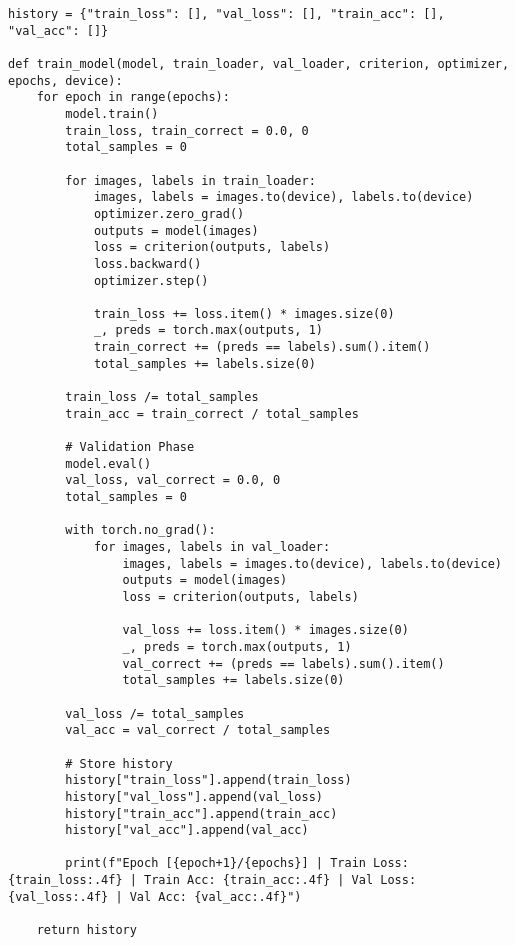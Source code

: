 \documentclass{article}
\begin{document}
\begin{verbatim}
history = {"train_loss": [], "val_loss": [], "train_acc": [], "val_acc": []}

def train_model(model, train_loader, val_loader, criterion, optimizer, epochs, device):
    for epoch in range(epochs):
        model.train()
        train_loss, train_correct = 0.0, 0
        total_samples = 0

        for images, labels in train_loader:
            images, labels = images.to(device), labels.to(device)
            optimizer.zero_grad()
            outputs = model(images)
            loss = criterion(outputs, labels)
            loss.backward()
            optimizer.step()

            train_loss += loss.item() * images.size(0)
            _, preds = torch.max(outputs, 1)
            train_correct += (preds == labels).sum().item()
            total_samples += labels.size(0)

        train_loss /= total_samples
        train_acc = train_correct / total_samples

        # Validation Phase
        model.eval()
        val_loss, val_correct = 0.0, 0
        total_samples = 0

        with torch.no_grad():
            for images, labels in val_loader:
                images, labels = images.to(device), labels.to(device)
                outputs = model(images)
                loss = criterion(outputs, labels)

                val_loss += loss.item() * images.size(0)
                _, preds = torch.max(outputs, 1)
                val_correct += (preds == labels).sum().item()
                total_samples += labels.size(0)

        val_loss /= total_samples
        val_acc = val_correct / total_samples

        # Store history
        history["train_loss"].append(train_loss)
        history["val_loss"].append(val_loss)
        history["train_acc"].append(train_acc)
        history["val_acc"].append(val_acc)

        print(f"Epoch [{epoch+1}/{epochs}] | Train Loss: {train_loss:.4f} | Train Acc: {train_acc:.4f} | Val Loss: {val_loss:.4f} | Val Acc: {val_acc:.4f}")

    return history

\end{verbatim}
\end{document}
